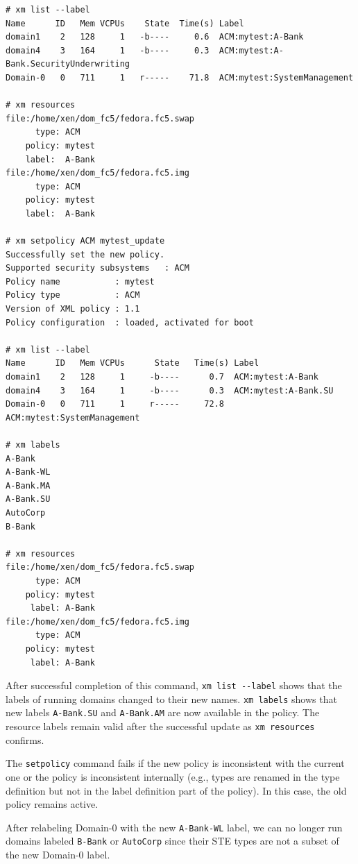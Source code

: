 \documentclass[11pt,twoside,final,openright]{report}
\begin{document}
\begin{scriptsize}
\begin{verbatim}
# xm list --label
Name      ID   Mem VCPUs    State  Time(s) Label
domain1    2   128     1   -b----     0.6  ACM:mytest:A-Bank
domain4    3   164     1   -b----     0.3  ACM:mytest:A-Bank.SecurityUnderwriting
Domain-0   0   711     1   r-----    71.8  ACM:mytest:SystemManagement

# xm resources
file:/home/xen/dom_fc5/fedora.fc5.swap
      type: ACM
    policy: mytest
    label:  A-Bank
file:/home/xen/dom_fc5/fedora.fc5.img
      type: ACM
    policy: mytest
    label:  A-Bank

# xm setpolicy ACM mytest_update
Successfully set the new policy.
Supported security subsystems   : ACM
Policy name           : mytest
Policy type           : ACM
Version of XML policy : 1.1
Policy configuration  : loaded, activated for boot

# xm list --label
Name      ID   Mem VCPUs      State   Time(s) Label
domain1    2   128     1     -b----      0.7  ACM:mytest:A-Bank
domain4    3   164     1     -b----      0.3  ACM:mytest:A-Bank.SU
Domain-0   0   711     1     r-----     72.8  ACM:mytest:SystemManagement

# xm labels
A-Bank
A-Bank-WL
A-Bank.MA
A-Bank.SU
AutoCorp
B-Bank

# xm resources
file:/home/xen/dom_fc5/fedora.fc5.swap
      type: ACM
    policy: mytest
     label: A-Bank
file:/home/xen/dom_fc5/fedora.fc5.img
      type: ACM
    policy: mytest
     label: A-Bank
    \end{verbatim}
\end{scriptsize}

After successful completion of this command, \verb|xm list --label|
shows that the labels of running domains changed to their new names.
\verb|xm labels| shows that new labels \verb|A-Bank.SU| and \verb|A-Bank.AM|
are now available in the policy. The resource labels remain valid after
the successful update as \verb|xm resources| confirms.

The \verb|setpolicy| command fails if the new policy is inconsistent
with the current one or the policy is inconsistent internally (e.g., types
are renamed in the type definition but not in the label definition part of
the policy). In this case, the old policy remains active.

After relabeling Domain-0 with the new \verb|A-Bank-WL| label, we can no
longer run domains labeled \verb|B-Bank| or \verb|AutoCorp| since their
STE types are not a subset of the new Domain-0 label.
\end{document}

